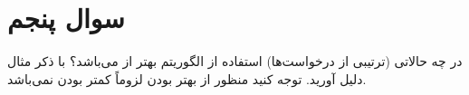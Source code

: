 \section{سوال پنجم}

در چه حالاتی (ترتیبی از درخواست‌ها) استفاده از الگوریتم  بهتر از  می‌باشد؟ با ذکر مثال دلیل آورید. توجه کنید منظور از بهتر بودن لزوماً کمتر بودن  نمی‌باشد.